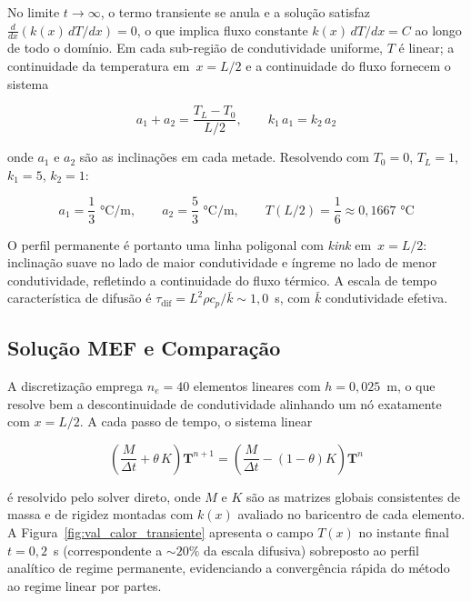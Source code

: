 No limite $t \to \infty$, o termo transiente se anula e a solução satisfaz $\frac{d}{dx}(k(x) \, dT/dx) = 0$, o que implica fluxo constante $k(x) \, dT/dx = C$ ao longo de todo o domínio. Em cada sub-região de condutividade uniforme, $T$ é linear; a continuidade da temperatura em~$x = L/2$ e a continuidade do fluxo fornecem o sistema

\begin{equation}
    a_1 + a_2 = \frac{T_L - T_0}{L/2}, \qquad k_1 \, a_1 = k_2 \, a_2
    \label{eq:val_calor_transiente_continuidade}
\end{equation}

\noindent onde $a_1$ e $a_2$ são as inclinações em cada metade. Resolvendo com $T_0 = 0$, $T_L = 1$, $k_1 = 5$, $k_2 = 1$:

\begin{equation}
    a_1 = \frac{1}{3} \text{~°C/m}, \qquad a_2 = \frac{5}{3} \text{~°C/m}, \qquad T(L/2) = \frac{1}{6} \approx 0{,}1667 \text{~°C}
    \label{eq:val_calor_transiente_analitica}
\end{equation}

O perfil permanente é portanto uma linha poligonal com \emph{kink} em~$x = L/2$: inclinação suave no lado de maior condutividade e íngreme no lado de menor condutividade, refletindo a continuidade do fluxo térmico. A escala de tempo característica de difusão é $\tau_{\mathrm{dif}} = L^2 \rho c_p / \bar{k} \sim 1{,}0$~s, com $\bar{k}$ condutividade efetiva.

\subsection{Solução MEF e Comparação}

A discretização emprega $n_e = 40$ elementos lineares com $h = 0{,}025$~m, o que resolve bem a descontinuidade de condutividade alinhando um nó exatamente com $x = L/2$. A cada passo de tempo, o sistema linear

\begin{equation}
    \left( \frac{M}{\Delta t} + \theta \, K \right) \mathbf{T}^{n+1} = \left( \frac{M}{\Delta t} - (1-\theta) K \right) \mathbf{T}^n
    \label{eq:val_calor_transiente_scheme}
\end{equation}

\noindent é resolvido pelo solver direto, onde $M$ e $K$ são as matrizes globais consistentes de massa e de rigidez montadas com $k(x)$ avaliado no baricentro de cada elemento. A Figura~\ref{fig:val_calor_transiente} apresenta o campo $T(x)$ no instante final $t = 0{,}2$~s (correspondente a $\sim 20\%$ da escala difusiva) sobreposto ao perfil analítico de regime permanente, evidenciando a convergência rápida do método ao regime linear por partes.

